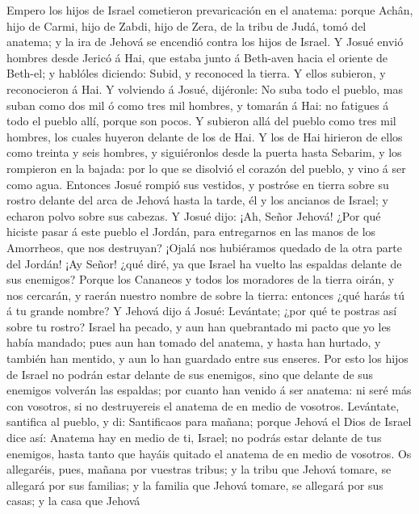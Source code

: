  Empero los hijos de Israel cometieron prevaricación en el
anatema: porque Achân, hijo de Carmi, hijo de Zabdi, hijo de Zera, de la
tribu de Judá, tomó del anatema; y la ira de Jehová se encendió contra
los hijos de Israel.  Y Josué envió hombres desde Jericó á
Hai, que estaba junto á Beth-aven hacia el oriente de Beth-el; y
hablóles diciendo: Subid, y reconoced la tierra. Y ellos subieron, y
reconocieron á Hai.  Y volviendo á Josué, dijéronle: No suba
todo el pueblo, mas suban como dos mil ó como tres mil hombres, y
tomarán á Hai: no fatigues á todo el pueblo allí, porque son pocos.
 Y subieron allá del pueblo como tres mil hombres, los
cuales huyeron delante de los de Hai.  Y los de Hai hirieron
de ellos como treinta y seis hombres, y siguiéronlos desde la puerta
hasta Sebarim, y los rompieron en la bajada: por lo que se disolvió el
corazón del pueblo, y vino á ser como agua.  Entonces Josué
rompió sus vestidos, y postróse en tierra sobre su rostro delante del
arca de Jehová hasta la tarde, él y los ancianos de Israel; y echaron
polvo sobre sus cabezas.  Y Josué dijo: ¡Ah, Señor Jehová!
¿Por qué hiciste pasar á este pueblo el Jordán, para entregarnos en las
manos de los Amorrheos, que nos destruyan? ¡Ojalá nos hubiéramos quedado
de la otra parte del Jordán!  ¡Ay Señor! ¿qué diré, ya que
Israel ha vuelto las espaldas delante de sus enemigos? 
Porque los Cananeos y todos los moradores de la tierra oirán, y nos
cercarán, y raerán nuestro nombre de sobre la tierra: entonces ¿qué
harás tú á tu grande nombre?  Y Jehová dijo á Josué:
Levántate; ¿por qué te postras así sobre tu rostro?  Israel
ha pecado, y aun han quebrantado mi pacto que yo les había mandado; pues
aun han tomado del anatema, y hasta han hurtado, y también han mentido,
y aun lo han guardado entre sus enseres.  Por esto los
hijos de Israel no podrán estar delante de sus enemigos, sino que
delante de sus enemigos volverán las espaldas; por cuanto han venido á
ser anatema: ni seré más con vosotros, si no destruyereis el anatema de
en medio de vosotros.  Levántate, santifica al pueblo, y
di: Santificaos para mañana; porque Jehová el Dios de Israel dice así:
Anatema hay en medio de ti, Israel; no podrás estar delante de tus
enemigos, hasta tanto que hayáis quitado el anatema de en medio de
vosotros.  Os allegaréis, pues, mañana por vuestras tribus;
y la tribu que Jehová tomare, se allegará por sus familias; y la familia
que Jehová tomare, se allegará por sus casas; y la casa que Jehová
